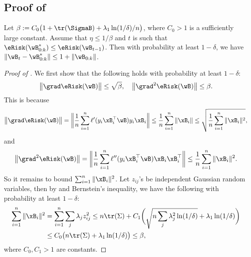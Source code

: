 \documentclass[11pt]{article}
\begin{document}
\subsection{Proof of \texorpdfstring{}{Theorem 3.1}}\label{sec:proof:gd:upper-bound}
\begin{lemma}\label{lemma:norm-bound}
Let  
\(\beta:= C_0 \big( 1+ \tr(\SigmaB) + \lambda_1 \ln(1/\delta)/n \big)\),
where $C_0>1$ is a sufficiently large constant.
Assume that $\eta \le 1/\beta$ and $t$ is such that $\eRisk(\wB^*_{0:k})\le \eRisk(\wB_{t-1})$.
Then with probability at least $1-\delta$, we have $\|\wB_t-\wB^*_{0:k}\|\le 1+\|\wB_{0:k}\| $.
\end{lemma}
\begin{proof}[Proof of ]
We first show that the following holds with probability at least $1-\delta$:
\begin{align*}
        \big\|\grad \eRisk(\wB) \big\| \le \sqrt{\beta},\quad 
        \big\|\grad^2 \eRisk(\wB) \big\| \le \beta.
\end{align*}
This is because 
\begin{align*}
    \big\|\grad \eRisk(\wB)\big\| = \bigg\| \frac{1}{n}\sum_{i=1}^n \ell'(y_i \xB_i^\top \wB) y_i \xB_i\bigg\| 
    \le \frac{1}{n} \sum_{i=1}^n \|\xB_i\| 
    \le \sqrt{\frac{1}{n} \sum_{i=1}^n \|\xB_i\|^2},
\end{align*}
and 
\begin{align*}
    \big\|\grad^2 \eRisk(\wB) \big\| = \bigg\|\frac{1}{n}\sum_{i=1}^n \ell''(y_i \xB_i^\top \wB) \xB_i \xB_i^\top \bigg\| 
    \le \frac{1}{n} \sum_{i=1}^n \|\xB_i\|^2.
\end{align*}
So it remains to bound $\sum_{i=1}^n \|\xB_i\|^2$.
Let $z_{ij}$'s be independent Gaussian random variables, then by  and Bernstein's inequality, we have the following with probability at least $1-\delta$:
\begin{align*}
    \sum_{i=1}^n \|\xB_i\|^2 &= \sum_{i=1}^n \sum_{j}\lambda_j z_{ij}^2
    \le n \tr(\Sigma) + C_1\bigg( \sqrt{n \sum_{j}\lambda_j^2 \ln(1/\delta)} + \lambda_1 \ln(1/\delta) \bigg) \\
    &\le C_0 \big( n \tr(\Sigma) +\lambda_1 \ln(1/\delta) \big) \le \beta,
\end{align*}
where $C_0, C_1>1$ are constants.


\end{proof}
\end{document}
